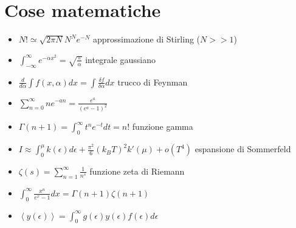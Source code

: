 \documentclass[a4paper]{article}
\begin{document}
    \section{Cose matematiche}
        \begin{itemize}
            \item $N!\simeq\sqrt{2\pi N}N^Ne^{-N}$ approssimazione di Stirling ($N>>1$)
            \item $\int_{-\infty}^{\infty}e^{-\alpha x^2}=\sqrt{\frac{\pi}{\alpha}}$ integrale gaussiano
            \item $\frac{d}{d\alpha}\int f(x,\alpha)dx=\int\frac{\delta f}{\delta\alpha}dx$ trucco di Feynman
            \item $\sum_{n=0}^\infty ne^{-an}=\frac{e^a}{(e^a-1)^2}$
            \item $\Gamma(n+1)=\int_0^\infty t^{n}e^{-t}dt=n!$ funzione gamma
            \item $I\approx\int_0^\mu k(\epsilon)d\epsilon+\frac{\pi^2}{6}(k_BT)^2k'(\mu)+o(T^4)$ espansione di Sommerfeld
            \item $\zeta(s)=\sum_{n=1}^\infty\frac{1}{n^s}$ funzione zeta di Riemann
            \item $\int_0^\infty\frac{x^n}{e^x-1}dx=\Gamma(n+1)\zeta(n+1)$
            \item $\left\langle y(\epsilon) \right\rangle=\int_0^\infty g(\epsilon)y(\epsilon)f(\epsilon)d\epsilon$
        \end{itemize}
\end{document}
